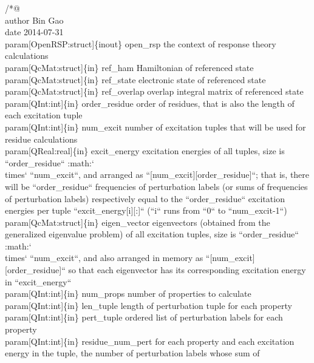 /*@%
     \\author Bin Gao
     \\date 2014-07-31
     \\param[OpenRSP:struct]\{inout\} open_rsp the context of response theory calculations
     \\param[QcMat:struct]\{in\} ref_ham Hamiltonian of referenced state
     \\param[QcMat:struct]\{in\} ref_state electronic state of referenced state
     \\param[QcMat:struct]\{in\} ref_overlap overlap integral matrix of referenced state
     \\param[QInt:int]\{in\} order_residue order of residues, that is also the length of
         each excitation tuple
     \\param[QInt:int]\{in\} num_excit number of excitation tuples that will be used for
         residue calculations
     \\param[QReal:real]\{in\} excit_energy excitation energies of all tuples, size is
         ``order_residue`` :math:`\\times` ``num_excit``, and arranged
         as ``[num_excit][order_residue]``; that is, there will be
         ``order_residue`` frequencies of perturbation labels (or sums
         of frequencies of perturbation labels) respectively equal to
         the ``order_residue`` excitation energies per tuple
         ``excit_energy[i][:]`` (``i`` runs from ``0`` to ``num_excit-1``)
     \\param[QcMat:struct]\{in\} eigen_vector eigenvectors (obtained from the generalized
         eigenvalue problem) of all excitation tuples, size is ``order_residue``
         :math:`\\times` ``num_excit``, and also arranged in memory
         as ``[num_excit][order_residue]`` so that each eigenvector has
         its corresponding excitation energy in ``excit_energy``
     \\param[QInt:int]\{in\} num_props number of properties to calculate
     \\param[QInt:int]\{in\} len_tuple length of perturbation tuple for each property
     \\param[QInt:int]\{in\} pert_tuple ordered list of perturbation labels
         for each property
     \\param[QInt:int]\{in\} residue_num_pert for each property and each excitation energy
         in the tuple, the number of perturbation labels whose sum of
